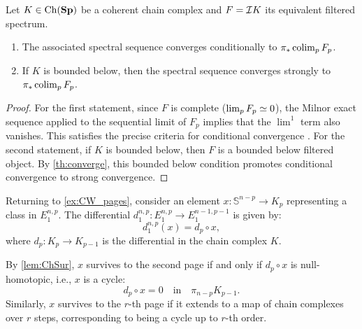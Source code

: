 \begin{cor}\label{cor:strong_cond_conv}
    Let $K \in \operatorname{Ch}(\mathbf{Sp})$ be a coherent chain complex and $F = \mathcal{I} K$ its equivalent filtered spectrum.
    \begin{enumerate}
        \item The associated spectral sequence converges conditionally to $\pi_* \operatorname*{colim}_p F_p$.
        \item If $K$ is bounded below, then the spectral sequence converges strongly to $\pi_* \operatorname*{colim}_p F_p$.
    \end{enumerate}
\end{cor}
\begin{proof}
    For the first statement, since $F$ is complete ($\lim_p F_p \simeq 0$), the Milnor exact sequence applied to the sequential limit of $F_p$ implies that the $\lim^1$ term also vanishes. This satisfies the precise criteria for conditional convergence \cite[Def.\ 5.10]{Boa99}.
    For the second statement, if $K$ is bounded below, then $F$ is a bounded below filtered object. By \cref{th:converge}, this bounded below condition promotes conditional convergence to strong convergence.
\end{proof}

\begin{exmp}
    Returning to \cref{ex:CW_pages}, consider an element $x\colon \mathbb{S}^{n - p} \to K_p$ representing a class in $E_1^{n,p}$. The differential $d_1^{n,p}\colon E_1^{n,p} \to E_1^{n - 1, p - 1}$ is given by:
    \begin{equation}
        d_1^{n,p}(x) = d_p \circ x,
    \end{equation}
    where $d_p\colon K_p \to K_{p - 1}$ is the differential in the chain complex $K$.

    By \cref{lem:ChSur}, $x$ survives to the second page if and only if $d_p \circ x$ is null-homotopic, i.e., $x$ is a cycle:
    \begin{equation}
        d_p \circ x = 0 \quad \text{in} \quad \pi_{n - p} K_{p - 1}.
    \end{equation}
    Similarly, $x$ survives to the $r$-th page if it extends to a map of chain complexes over $r$ steps, corresponding to being a cycle up to $r$-th order.
\end{exmp}

